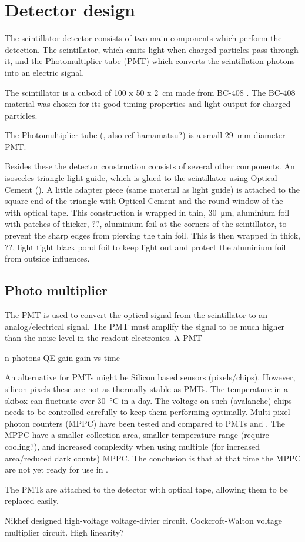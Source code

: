 \section{Detector design}

The scintillator detector consists of two main components which perform the detection. The scintillator, which emits light when charged particles pass through it, and the Photomultiplier tube (PMT) which converts the scintillation photons into an electric signal.

The scintillator is a cuboid of \SI[product-units=power]{100 x 50 x
2}{\centi\meter} made from BC-408 \cite{bc408}. The BC-408 material was
chosen for its good timing properties and light output for charged particles.

The Photomultiplier tube (\cite{et:pmt}, also ref hamamatsu?) is a small
\SI{29}{\milli\meter} diameter PMT.

Besides these the detector construction consists of several other components.
An isosceles triangle light guide, which is glued to the scintillator using
Optical Cement (\cite{bc600}). A little adapter piece (same material as light
guide) is attached to the square end of the triangle with Optical Cement and
the round window of the \pmt with optical tape. This construction is wrapped
in thin, \SI{30}{\micro\meter}, aluminium foil with patches of thicker, ??,
aluminium foil at the corners of the scintillator, to prevent the sharp edges
from piercing the thin foil. This is then wrapped in thick, ??, light tight
black pond foil to keep light out and protect the aluminium foil from outside
influences.


\subsection{Photo multiplier}

The PMT is used to convert the optical signal from the scintillator to an analog/electrical signal. The PMT must amplify the signal to be much higher than the noise level in the readout electronics. A PMT 

n photons
QE
gain
gain vs time

An alternative for PMTs might be Silicon based sensors (pixels/chips). However, silicon pixels these are not as thermally stable as PMTs. The temperature in a \hisparc skibox can fluctuate over \SI{30}{\degreeCelsius} in a day. The voltage on such (avalanche) chips needs to be controlled carefully to keep them performing optimally. Multi-pixel photon counters (MPPC) have been tested and compared to PMTs \cite[Chapter~3.4]{lio2011} and \cite[Chapter~3.6]{lio2010}. The MPPC have a smaller collection area, smaller temperature range (require cooling?), and increased complexity when using multiple (for increased area/reduced dark counts) MPPC. The conclusion is that at that time the MPPC are not yet ready for use in \hisparc.

The PMTs are attached to the detector with optical tape, allowing them to be replaced easily.

Nikhef designed high-voltage voltage-divier circuit.
Cockcroft-Walton voltage multiplier circuit.
High linearity?

